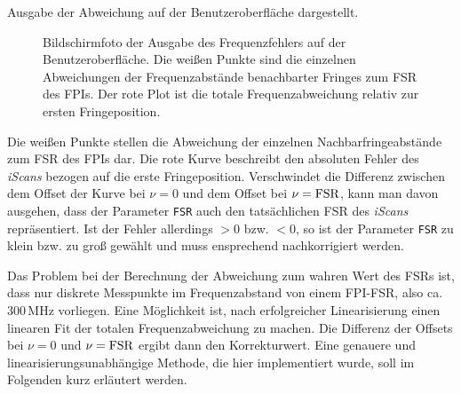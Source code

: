 Ausgabe der Abweichung auf der Benutzeroberfläche dargestellt.
\begin{figure}[h]
 	\centering
	\caption[Benutzeroberfläche Linearisierung -
	Frequenzfehler]{Bildschirmfoto der Ausgabe des Frequenzfehlers
	auf der Benutzeroberfläche. Die weißen Punkte sind die einzelnen Abweichungen
	der Frequenzabstände benachbarter Fringes zum FSR des FPIs. Der rote Plot ist
	die totale Frequenzabweichung relativ zur ersten Fringeposition.}
	\label{fig:linearisierung_benutzeroberflaeche_frequenz-abweichung}
\end{figure}
Die weißen Punkte stellen die Abweichung der einzelnen Nachbarfringeabstände zum
FSR des FPIs dar. Die rote Kurve beschreibt den absoluten Fehler des
\textit{iScans} bezogen auf die erste Fringeposition. Verschwindet die
Differenz zwischen dem Offset der Kurve bei $\nu=0$ und dem Offset bei
$\nu=\text{\lstinline|FSR|}$, kann man davon ausgehen, dass der Parameter
\lstinline|FSR| auch den tatsächlichen FSR des \textit{iScans} repräsentiert.
Ist der Fehler allerdings $>0$ bzw. $<0$, so
ist der Parameter \lstinline|FSR| zu klein bzw. zu groß gewählt und muss
ensprechend nachkorrigiert werden.\par
Das Problem bei der Berechnung der Abweichung
zum wahren Wert des FSRs ist, dass nur diskrete Messpunkte im Frequenzabstand
von einem FPI-FSR, also ca. $300\,$MHz vorliegen. Eine Möglichkeit ist, nach
erfolgreicher Linearisierung einen linearen Fit der totalen Frequenzabweichung
zu machen. Die Differenz der Offsets bei $\nu=0$ und
$\nu=\text{\lstinline|FSR|}$ ergibt dann den Korrekturwert. Eine genauere und
linearisierungsunabhängige Methode, die hier implementiert wurde, soll im
Folgenden kurz erläutert werden.\par
